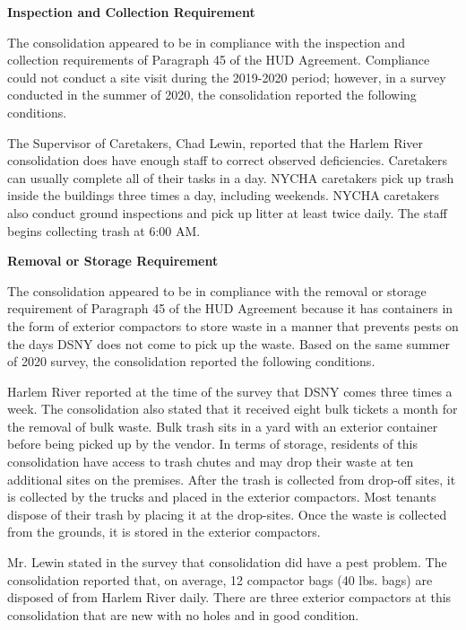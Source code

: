  

\textbf{Inspection and Collection Requirement} 

 

The consolidation appeared to be in compliance with the inspection and collection requirements of Paragraph 45 of the HUD Agreement. Compliance could not conduct a site visit during the 2019-2020 period; however, in a survey conducted in the summer of 2020, the consolidation reported the following conditions.

The Supervisor of Caretakers, Chad Lewin, reported that the Harlem River consolidation does have enough staff to correct observed deficiencies. Caretakers can usually complete all of their tasks in a day. NYCHA caretakers pick up trash inside the buildings three times a day, including weekends. NYCHA caretakers also conduct ground inspections and pick up litter at least twice daily. The staff begins collecting trash at 6:00 AM.

\textbf{Removal or Storage Requirement} 

The consolidation appeared to be in compliance with the removal or storage requirement of Paragraph  45 of the HUD Agreement because it has containers in the form of exterior compactors to store waste in a manner that prevents pests on the days DSNY does not come to pick up the waste. Based on the same summer of  2020  survey, the consolidation reported the following conditions.

  

Harlem River reported at the time of the survey that DSNY comes three times a week. The consolidation also stated that it received eight bulk tickets a month for the removal of bulk waste. Bulk trash sits in a yard with an exterior container before being picked up by the vendor. In terms of storage, residents of this consolidation have access to trash chutes and may drop their waste at ten additional sites on the premises. After the trash is collected from drop-off sites, it is collected by the trucks and placed in the exterior compactors.  Most tenants dispose of their trash by placing it at the drop-sites. Once the waste is collected from the grounds, it is stored in the exterior compactors.  

 

Mr. Lewin stated in the survey that consolidation did have a pest problem. The consolidation reported that, on average, 12 compactor bags (40 lbs. bags)  are disposed of from Harlem River daily. There are three exterior compactors at this consolidation that are new with no holes and in good condition.

